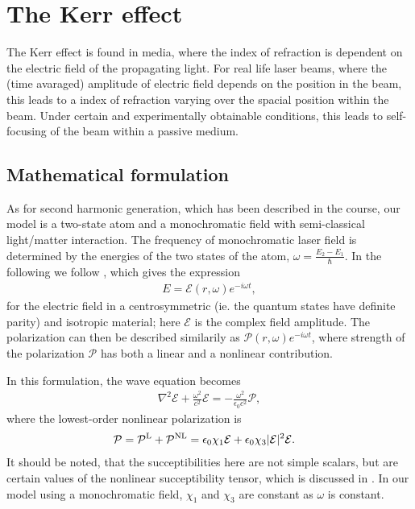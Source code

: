 \chapter{The Kerr effect}
\label{cha:kerr}

The Kerr effect is found in media, where the index of refraction is
dependent on the electric field of the propagating light. For real
life laser beams, where the (time avaraged) amplitude of electric
field depends on the position in the beam, this leads to a index of
refraction varying over the spacial position within the beam. Under
certain and experimentally obtainable conditions, this leads to
self-focusing of the beam within a passive medium.


\section{Mathematical formulation}
\label{sec:kerr-math}

As for second harmonic generation, which has been described in the
course, our model is a two-state atom and a monochromatic field with
semi-classical light/matter interaction. The frequency of
monochromatic laser field is determined by the energies of the two
states of the atom, $\omega = \frac{E_2 - E_1}{\hbar}$. In the
following we follow \textcite[][sec. 10.3]{milonni}, which gives the
expression
\begin{align}
  \label{eq:kerr-laser-field}
  E = \mathcal{E}(r, \omega) e^{-i \omega t},
\end{align}
for the electric field in a centrosymmetric (ie. the quantum states
have definite parity) and isotropic material; here $\mathcal{E}$ is
the complex field amplitude. The polarization can then be described
similarily as $\mathcal{P}(r, \omega) e^{-i \omega t}$, where strength
of the polarization $\mathcal{P}$ has both a linear and a nonlinear
contribution.

In this formulation, the wave equation becomes
\begin{align}
  \label{eq:kerr-wave-eqn}
  \nabla^2 \mathcal{E} + \frac{\omega^2}{c^2} \mathcal{E}
  = - \frac{\omega^2}{\epsilon_0 c^2} \mathcal{P},
\end{align}
where the lowest-order nonlinear polarization is
\begin{align}
  \mathcal{P} &= \mathcal{P}^{\textup L} + \mathcal{P}^{\textup{NL}}
  \label{eq:kerr-polarization}
  = \epsilon_0 \chi_1 \mathcal{E}
  + \epsilon_0 \chi_3 |\mathcal{E}|^2 \mathcal{E}.
\end{align}
It should be noted, that the succeptibilities here are not simple
scalars, but are certain values of the nonlinear succeptibility
tensor, which is discussed in \textcite[sec.~10.2]{milonni}. In
our model using a monochromatic field, $\chi_1$ and $\chi_3$ are
constant as $\omega$ is constant.

